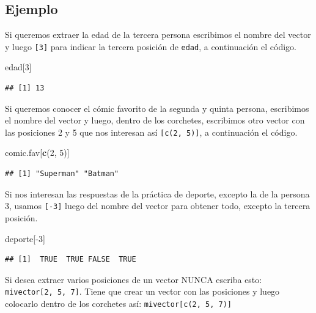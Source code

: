 \documentclass[10pt,]{krantz}
\makeatletter
\newenvironment{Shaded}{\begin{snugshade}}{\end{snugshade}}
\newcommand{\KeywordTok}[1]{\textcolor[rgb]{0.13,0.29,0.53}{\textbf{{#1}}}}
\newcommand{\DecValTok}[1]{\textcolor[rgb]{0.00,0.00,0.81}{{#1}}}
\newcommand{\NormalTok}[1]{{#1}}
\newenvironment{kframe}{%
\medskip{}
\setlength{\fboxsep}{.8em}
 \def\at@end@of@kframe{}%
 \ifinner\ifhmode%
  \def\at@end@of@kframe{\end{minipage}}%
  \begin{minipage}{\columnwidth}%
 \fi\fi%
 \def\FrameCommand##1{\hskip\@totalleftmargin \hskip-\fboxsep
 \colorbox{shadecolor}{##1}\hskip-\fboxsep
     \hskip-\linewidth \hskip-\@totalleftmargin \hskip\columnwidth}%
 \MakeFramed {\advance\hsize-\width
   \@totalleftmargin\z@ \linewidth\hsize
   \@setminipage}}%
 {\par\unskip\endMakeFramed%
 \at@end@of@kframe}
\renewenvironment{Shaded}{\begin{kframe}}{\end{kframe}}
\let\BeginKnitrBlock\begin \let\EndKnitrBlock\end
\makeatother
\begin{document}
\subsection*{Ejemplo}\label{ejemplo}


Si queremos extraer la edad de la tercera persona escribimos el nombre
del vector y luego \texttt{{[}3{]}} para indicar la tercera posición de
\texttt{edad}, a continuación el código.

\begin{Shaded}
\begin{Highlighting}[]
\NormalTok{edad[}\DecValTok{3}\NormalTok{]}
\end{Highlighting}
\end{Shaded}

\begin{verbatim}
## [1] 13
\end{verbatim}

Si queremos conocer el cómic favorito de la segunda y quinta persona,
escribimos el nombre del vector y luego, dentro de los corchetes,
escribimos otro vector con las posiciones 2 y 5 que nos interesan así
\texttt{{[}c(2,\ 5){]}}, a continuación el código.

\begin{Shaded}
\begin{Highlighting}[]
\NormalTok{comic.fav[}\KeywordTok{c}\NormalTok{(}\DecValTok{2}\NormalTok{, }\DecValTok{5}\NormalTok{)]}
\end{Highlighting}
\end{Shaded}

\begin{verbatim}
## [1] "Superman" "Batman"
\end{verbatim}

Si nos interesan las respuestas de la práctica de deporte, excepto la de
la persona 3, usamos \texttt{{[}-3{]}} luego del nombre del vector para
obtener todo, excepto la tercera posición.

\begin{Shaded}
\begin{Highlighting}[]
\NormalTok{deporte[-}\DecValTok{3}\NormalTok{]}
\end{Highlighting}
\end{Shaded}

\begin{verbatim}
## [1]  TRUE  TRUE FALSE  TRUE
\end{verbatim}

\BeginKnitrBlock{rmdwarning}
Si desea extraer varios posiciones de un vector NUNCA escriba esto:
\texttt{mivector{[}2,\ 5,\ 7{]}}. Tiene que crear un vector con las
posiciones y luego colocarlo dentro de los corchetes así:
\texttt{mivector{[}c(2,\ 5,\ 7){]}}
\EndKnitrBlock{rmdwarning}
\end{document}
